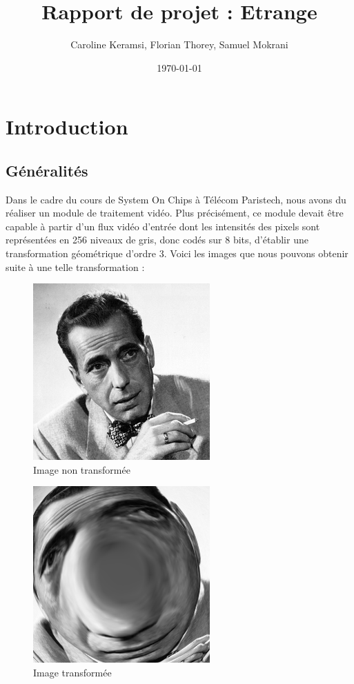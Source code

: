 \documentclass[a4paper,12pt]{report}
\title{Rapport de projet : Etrange}
\author {Caroline Keramsi, Florian Thorey, Samuel Mokrani}
\date{\today}
\begin{document}
\maketitle
\tableofcontents    %
\listoffigures        %

\chapter{Introduction}

\section{Généralités}

{Dans le cadre du cours de System On Chips à Télécom Paristech, nous avons du réaliser
  un module de traitement vidéo. Plus précisément, ce module devait être capable à partir d'un flux vidéo d'entrée dont les intensités des pixels sont représentées en 256 niveaux de gris, donc codés sur 8 bits, d'établir une transformation géométrique d'ordre 3. Voici les images que nous pouvons obtenir suite à une telle transformation :}

\begin{figure}[!h]
  \centering
  \includegraphics[scale = 0.5]{bogart.png}
  \caption{Image non transformée}
\end{figure}

\begin{figure}[!h]
  \centering
  \includegraphics[scale = 0.5]{bogart_tr.png}
  \caption{Image transformée}
\end{figure}
\end{document}
